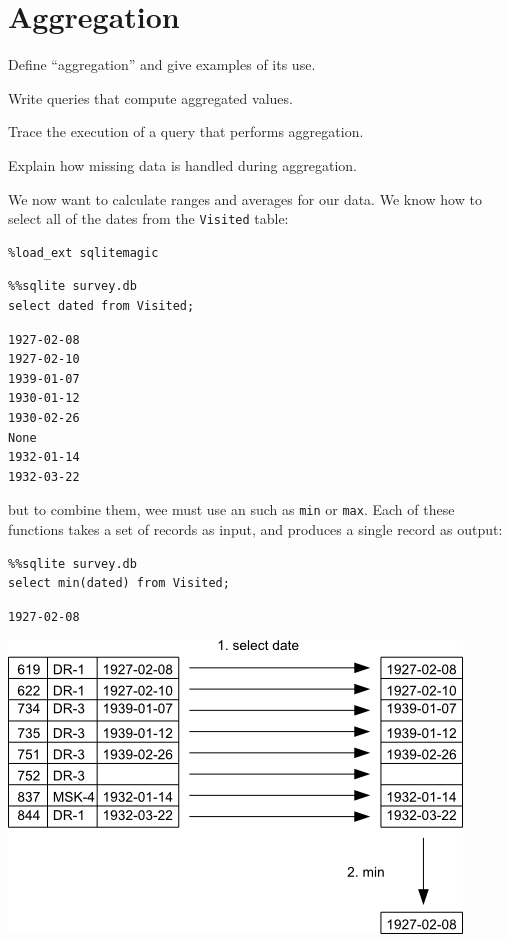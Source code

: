 \documentclass{book}
\begin{document}
\section{Aggregation}

\begin{objectives}
\begin{swcitemize}
\item
  Define ``aggregation'' and give examples of its use.
\item
  Write queries that compute aggregated values.
\item
  Trace the execution of a query that performs aggregation.
\item
  Explain how missing data is handled during aggregation.
\end{swcitemize}
\end{objectives}

We now want to calculate ranges and averages for our data. We know how
to select all of the dates from the \texttt{Visited} table:

\begin{verbatim}
%load_ext sqlitemagic
\end{verbatim}

\begin{verbatim}
%%sqlite survey.db
select dated from Visited;
\end{verbatim}

\begin{verbatim}
1927-02-08
1927-02-10
1939-01-07
1930-01-12
1930-02-26
None
1932-01-14
1932-03-22
\end{verbatim}

but to combine them, wee must use an
 such as
\texttt{min} or \texttt{max}. Each of these functions takes a set of
records as input, and produces a single record as output:

\begin{verbatim}
%%sqlite survey.db
select min(dated) from Visited;
\end{verbatim}

\begin{verbatim}
1927-02-08
\end{verbatim}

\includegraphics{novice/sql/img/sql-aggregation.png}
\end{document}
